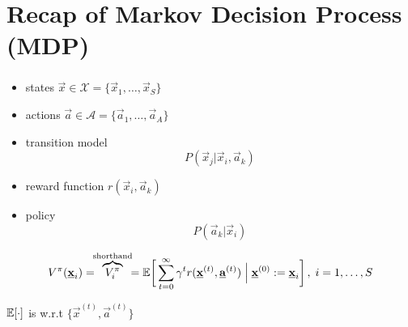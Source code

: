 \section{Recap of Markov Decision Process (MDP)}

\begin{frame}\frametitle{\secname}

\begin{itemize}
\item[] states $\vec x \in \mathcal{X} = \{ \vec x_1, \ldots, \vec x_S\}$
\item[] actions $\vec a \in \mathcal{A} = \{ \vec a_1, \ldots, \vec a_A\}$
\item[] transition model
\begin{equation}
P(\vec x_j | \vec x_i, \vec a_k)
\end{equation}
\pause
\item[] reward function $r(\vec x_i, \vec a_k)$
\item[] policy 
\begin{equation}
P(\vec a_k | \vec x_i)
\end{equation}

\end{itemize}

	\begin{align}
	V^\pi(\underline{\mathbf{x}}_i) = \kern-1ex \overbrace{V^\pi_i}^{\text{shorthand}} \kern-1ex = 
	\mathbb{E} \bigg\lbrack
	\sum_{t=0}^{\infty} \gamma^t r(\underline{\mathbf{x}}^{(t)}, \underline{\mathbf{a}}^{(t)}) \;\Big|\; \underline{\mathbf{x}}^{(0)} := \underline{\mathbf{x}}_i
	\bigg\rbrack\,, \; i=1,\ldots,S
	\end{align}
	
	$\mathbb{E}\lbrack\cdot\rbrack$ is w.r.t $\{\vec x^{(t)}, \vec a^{(t)}\}$

\end{frame}
